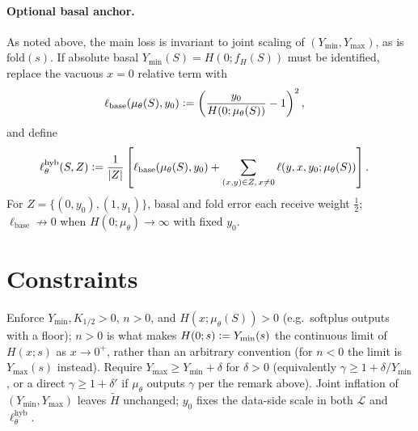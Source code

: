 \documentclass{article}
\theoremstyle{plain}
\theoremstyle{remark}
\begin{document}
\paragraph{Optional basal anchor.}
As noted above, the main loss is invariant to joint scaling of $(Y_{\min},Y_{\max})$, as is $\mathrm{fold}(s)$.
If absolute basal $Y_{\min}(S)=H(0;f_H(S))$ must be identified, replace the vacuous $x=0$ relative term with
\begin{align*}
    \ell_{\mathrm{base}}(\mu_{\theta}(S),y_0)
     & \vcentcolon= \left(\frac{y_0}{H(0;\mu_{\theta}(S))} - 1\right)^2,
\end{align*}
and define
\begin{align*}
    \ell^{\mathrm{hyb}}_{\theta}(S,Z)
     & \vcentcolon= \frac{1}{|Z|}\left[
        \ell_{\mathrm{base}}(\mu_{\theta}(S),y_0)
        + \sum_{(x,y)\in Z,\, x\neq 0} \ell(y,x,y_0;\mu_{\theta}(S))
        \right].
\end{align*}
For $Z=\{(0,y_0),(1,y_1)\}$, basal and fold error each receive weight $\tfrac12$; $\ell_{\mathrm{base}}\not\to 0$ when $H(0;\mu_{\theta})\to\infty$ with fixed $y_0$.

\section{Constraints}
\label{sec:constraints}
Enforce $Y_{\min},K_{1/2}>0$, $n>0$, and $H(x;\mu_{\theta}(S))>0$ (e.g.\ softplus outputs with a floor); $n>0$ is what makes $H(0;s)\vcentcolon= Y_{\min}(s)$ the continuous limit of $H(x;s)$ as $x\to0^+$, rather than an arbitrary convention (for $n<0$ the limit is $Y_{\max}(s)$ instead).
Require $Y_{\max}\ge Y_{\min}+\delta$ for $\delta>0$ (equivalently $\gamma\ge1+\delta/Y_{\min}$, or a direct $\gamma\ge1+\delta'$ if $\mu_{\theta}$ outputs $\gamma$ per the remark above).
Joint inflation of $(Y_{\min},Y_{\max})$ leaves $\widetilde{H}$ unchanged; $y_0$ fixes the data-side scale in both $\mathcal{L}$ and $\ell^{\mathrm{hyb}}_{\theta}$.

\appendix

\end{document}
